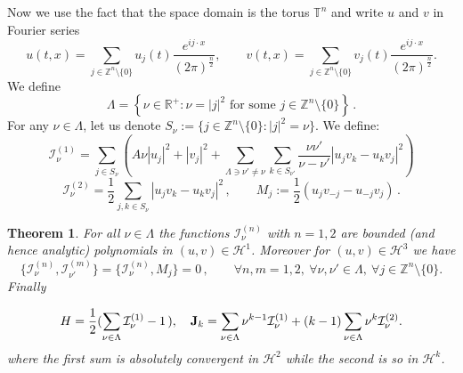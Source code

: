 \documentclass[reqno,11pt]{amsart}
\theoremstyle{plain}
\numberwithin{equation}{section}
\newtheorem{theorem}{Theorem}[section]
\newcommand{\Z}{\mathbb{Z}}
\newcommand{\T}{\mathbb{T}}
\renewcommand{\H}{\mathcal{H}}
\newcommand{\I}{{\texttt{\bf J}}}
\begin{document}
Now we use  the fact that the space domain is the  torus $\T^n$ and  write $u$ and $v$ in Fourier series
\begin{equation}\label{fourier}
	u(t,x) = \sum_{j\in\Z^n\setminus\{0\}} u_j(t) \frac{e^{ij \cdot x}}{(2\pi)^\frac{n}{2}}, \qquad v(t,x) = \sum_{j\in\Z^n\setminus\{0\}} v_j(t) \frac{e^{ij \cdot x}}{(2\pi)^\frac{n}{2}}.
\end{equation}
We define 
\begin{equation}
	\Lambda = \left\{ \nu \in \mathbb{R}^+ : \nu = |j|^2 \text{ for some } j \in \mathbb{Z}^n \setminus \{0\} \right\}\,.
\end{equation}
For any $\nu \in \Lambda$, let us denote  $S_\nu:= \{j\in \Z^n\setminus \{0\} :  |j|^2=\nu\}$.
We define:
\begin{equation}\label{eq:Gamma1}
	\mathcal I_\nu^{(1)} = \sum_{j \in S_\nu} \left( A \nu |u_j|^2 + |v_j|^2 + \sum_{\Lambda\ni \nu'\ne \nu} \sum_{k \in S_{\nu'}} \frac{\nu \nu' }{\nu - \nu'} |u_j v_k - u_k v_j|^2 \right)
\end{equation}
\begin{equation}\label{eq:Gamma2}
	\mathcal I_\nu^{(2)} = \frac{1}{2} \sum_{j, k \in S_\nu} |u_j v_k - u_k v_j|^2\,,\qquad M_j:=  \frac{1}{2}  (u_j v_{-j} - u_{-j}v_j)\,.
\end{equation}

\begin{theorem}\label{genero}
	For all $\nu\in \Lambda$ the functions $\mathcal I^{(n)}_\nu$ with $n=1,2$  are bounded (and hence analytic) polynomials in $(u,v)\in \H^1$. Moreover for $(u,v)\in \H^3$ we have  
	\[
	\{\mathcal I^{(n)}_\nu,\mathcal I^{(m)}_{\nu'} \} = 	\{\mathcal I^{(n)}_\nu, M_j\}=0 \,,\qquad \forall n,m=1,2,\ \forall \nu,\nu'\in \Lambda, \ \forall j\in \mathbb{Z}^n \setminus \{0\}.
	\]
	Finally
	
	\begin{equation}\label{calIJ}
		H = \frac12(\sum_{\nu \in \Lambda} \mathcal I^{(1)}_\nu-1\,),\quad
		\I_k = \sum_{\nu \in \Lambda} \nu^{k-1} \mathcal I^{(1)}_\nu + (k-1) \sum_{\nu \in \Lambda} \nu^{k} \mathcal I^{(2)}_\nu.
	\end{equation}
	where the first sum is absolutely convergent in $\H^{2}$ while the second is so in  $\H^{k}$.
\end{theorem}
\end{document}
